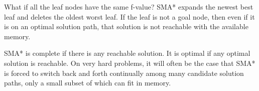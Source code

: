 \documentclass{article}
\begin{document}
What if all the leaf nodes have the same f-value? SMA* expands the newest best leaf and deletes the oldest worst leaf. If the leaf is not a goal node, then even if it is on an optimal solution path, that solution is not reachable with the available memory.

SMA* is complete if there is any reachable solution. It is optimal if any optimal solution is reachable. On very hard problems, it will often be the case that SMA* is forced to switch back and forth continually among many candidate solution paths, only a small subset of which can fit in memory.
\end{document}
